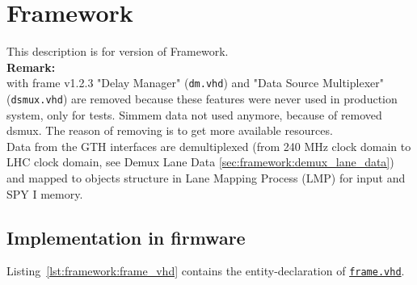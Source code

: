 \section{Framework}\label{sec:framework:framework}

This description is for version \versionframe of Framework.\\

\textbf{Remark:}\\
with frame v1.2.3 "Delay Manager" (\texttt{\textquotesingle dm.vhd\textquotesingle }) and "Data Source Multiplexer" (\texttt{\textquotesingle dsmux.vhd\textquotesingle }) are removed because these features were never used in production system, only for tests.
Simmem data not used anymore, because of removed dsmux.
The reason of removing is to get more available resources.\\

Data from the GTH interfaces are demultiplexed (from 240 MHz clock domain to LHC clock domain, see Demux Lane Data \ref{sec:framework:demux_lane_data}) and mapped to objects structure in Lane Mapping Process (LMP) for \ugtl input and SPY I memory.

\subsection{Implementation in firmware}
\label{sec:framework:implementation_firmware}

Listing~\ref{lst:framework:frame_vhd} contains the entity-declaration of \href{\gitbranch/firmware/hdl/payload/frame.vhd}{\texttt{\textquotesingle frame.vhd\textquotesingle }}.\\



\clearpage

